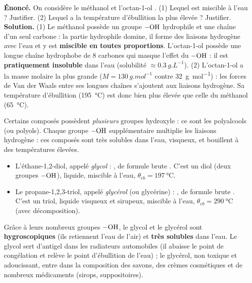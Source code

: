 \documentclass[11pt]{article}
\newcommand{\cle}[1]{{\popxbold\color{popdark}#1}}
\newcounter{popsec}
\newcounter{popsub}
\newcommand{\courssub}[1]{%
  \stepcounter{popsub}%
  \par\vspace{9pt}\noindent{\popxbold\fontsize{11.5}{13}\selectfont\color{popink}{\color{poporange}\thepopsec.\thepopsub}\hspace{6pt}#1}\par\nopagebreak\vspace{4pt}
}
\begin{document}
\begin{exoresolu}
\textbf{Énoncé.} On considère le méthanol  et l'octan-1-ol . (1) Lequel est miscible à l'eau ? Justifier. (2) Lequel a la température d'ébullition la plus élevée ? Justifier.
\tcblower
\textbf{Solution.} (1) Le méthanol possède un groupe $-\ce{OH}$ hydrophile et une chaîne d'un seul carbone : la partie hydrophile domine, il forme des liaisons hydrogène avec l'eau et y est \textbf{miscible en toutes proportions}. L'octan-1-ol possède une longue chaîne hydrophobe de 8 carbones qui masque l'effet du $-\ce{OH}$ : il est \textbf{pratiquement insoluble} dans l'eau (solubilité $\approx \SI{0,3}{g.L^{-1}}$). (2) L'octan-1-ol a la masse molaire la plus grande ($M = \SI{130}{g.mol^{-1}}$ contre \SI{32}{g.mol^{-1}}) : les forces de Van der Waals entre ses longues chaînes s'ajoutent aux liaisons hydrogène. Sa température d'ébullition (\SI{195}{\celsius}) est donc bien plus élevée que celle du méthanol (\SI{65}{\celsius}).
\end{exoresolu}

\courssub{Les polyalcools : glycol et glycérol}

Certains composés possèdent \emph{plusieurs} groupes hydroxyle : ce sont les \cle{polyalcools} (ou polyols). Chaque groupe $-\ce{OH}$ supplémentaire multiplie les liaisons hydrogène : ces composés sont très solubles dans l'eau, visqueux, et bouillent à des températures élevées.

\begin{definition}
\begin{itemize}
\item L'\cle{éthane-1,2-diol}, appelé \emph{glycol} : , de formule brute . C'est un diol (deux groupes $-\ce{OH}$), liquide, miscible à l'eau, $\theta_{eb} = \SI{197}{\celsius}$.
\item Le \cle{propane-1,2,3-triol}, appelé \emph{glycérol} (ou glycérine) : , de formule brute . C'est un triol, liquide visqueux et sirupeux, miscible à l'eau, $\theta_{eb} = \SI{290}{\celsius}$ (avec décomposition).
\end{itemize}
\end{definition}

\begin{exemplebox}
Grâce à leurs nombreux groupes $-\ce{OH}$, le glycol et le glycérol sont \textbf{hygroscopiques} (ils retiennent l'eau de l'air) et \textbf{très solubles} dans l'eau. Le glycol sert d'\cle{antigel} dans les radiateurs automobiles (il abaisse le point de congélation et relève le point d'ébullition de l'eau) ; le glycérol, non toxique et adoucissant, entre dans la composition des savons, des crèmes cosmétiques et de nombreux médicaments (sirops, suppositoires).
\end{exemplebox}
\end{document}
